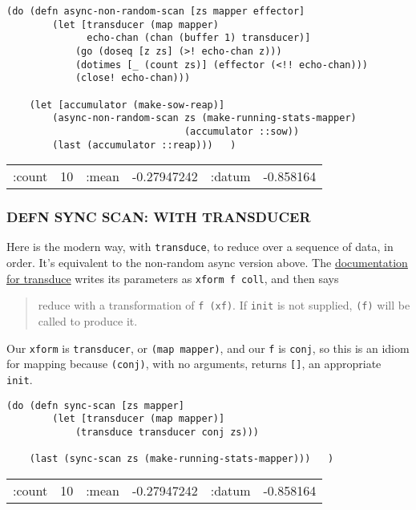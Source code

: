 \documentclass[10pt,oneside,x11names]{article}
\begin{document}
\begin{verbatim}
(do (defn async-non-random-scan [zs mapper effector]
        (let [transducer (map mapper)
              echo-chan (chan (buffer 1) transducer)]
            (go (doseq [z zs] (>! echo-chan z)))
            (dotimes [_ (count zs)] (effector (<!! echo-chan)))
            (close! echo-chan)))

    (let [accumulator (make-sow-reap)]
        (async-non-random-scan zs (make-running-stats-mapper)
                               (accumulator ::sow))
        (last (accumulator ::reap)))   )
\end{verbatim}

\begin{center}
\begin{tabular}{lrlrlr}
:count & 10 & :mean & -0.27947242 & :datum & -0.858164\\
\end{tabular}
\end{center}

\subsubsection{DEFN SYNC SCAN: WITH TRANSDUCER}
\label{sync-scan-with-transducer}
Here is the modern way, with \texttt{transduce}, to reduce over a sequence of
data, in order. It's equivalent to the non-random async version above.
The \href{https://clojuredocs.org/clojure.core/transduce}{documentation for
transduce} writes its parameters as \texttt{xform f coll}, and then says

\begin{quote}
reduce with a transformation of \texttt{f (xf)}. If \texttt{init} is not supplied,
\texttt{(f)} will be called to produce it.
\end{quote}

Our \texttt{xform} is \texttt{transducer}, or \texttt{(map mapper)}, and our \texttt{f} is \texttt{conj},
so this is an idiom for mapping because \texttt{(conj)}, with no arguments,
returns \texttt{[]}, an appropriate \texttt{init}.

\begin{verbatim}
(do (defn sync-scan [zs mapper]
        (let [transducer (map mapper)]
            (transduce transducer conj zs)))

    (last (sync-scan zs (make-running-stats-mapper)))   )
\end{verbatim}

\begin{center}
\begin{tabular}{lrlrlr}
:count & 10 & :mean & -0.27947242 & :datum & -0.858164\\
\end{tabular}
\end{center}
\end{document}
